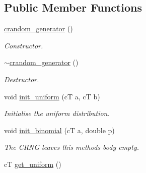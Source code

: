 \subsection*{Public Member Functions}
\begin{DoxyCompactItemize}
\item 
\hyperlink{classlgraph_1_1utils_1_1crandom__generator_a90bfc340dcb2fa15e744cff6e280978a}{crandom\+\_\+generator} ()\hypertarget{classlgraph_1_1utils_1_1crandom__generator_a90bfc340dcb2fa15e744cff6e280978a}{}\label{classlgraph_1_1utils_1_1crandom__generator_a90bfc340dcb2fa15e744cff6e280978a}

\begin{DoxyCompactList}\small\item\em Constructor. \end{DoxyCompactList}\item 
\hyperlink{classlgraph_1_1utils_1_1crandom__generator_ade03d6aba0a68ba5b34582cf8107b7aa}{$\sim$crandom\+\_\+generator} ()\hypertarget{classlgraph_1_1utils_1_1crandom__generator_ade03d6aba0a68ba5b34582cf8107b7aa}{}\label{classlgraph_1_1utils_1_1crandom__generator_ade03d6aba0a68ba5b34582cf8107b7aa}

\begin{DoxyCompactList}\small\item\em Destructor. \end{DoxyCompactList}\item 
void \hyperlink{classlgraph_1_1utils_1_1crandom__generator_addfa5951276296b2a164e5dc482728ce}{init\+\_\+uniform} (cT a, cT b)
\begin{DoxyCompactList}\small\item\em Initialise the uniform distribution. \end{DoxyCompactList}\item 
void \hyperlink{classlgraph_1_1utils_1_1crandom__generator_a4d7042cb0862c3b8b4792890e6c5388c}{init\+\_\+binomial} (cT a, double p)\hypertarget{classlgraph_1_1utils_1_1crandom__generator_a4d7042cb0862c3b8b4792890e6c5388c}{}\label{classlgraph_1_1utils_1_1crandom__generator_a4d7042cb0862c3b8b4792890e6c5388c}

\begin{DoxyCompactList}\small\item\em The C\+R\+NG leaves this method\textquotesingle{}s body empty. \end{DoxyCompactList}\item 
cT \hyperlink{classlgraph_1_1utils_1_1crandom__generator_a39dd7f9d80fd5be685cc240719050119}{get\+\_\+uniform} ()\hypertarget{classlgraph_1_1utils_1_1crandom__generator_a39dd7f9d80fd5be685cc240719050119}{}\label{classlgraph_1_1utils_1_1crandom__generator_a39dd7f9d80fd5be685cc240719050119}


\end{DoxyCompactItemize}
